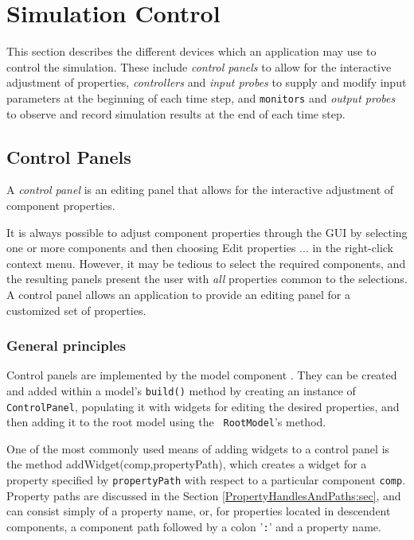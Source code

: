 
\section{Simulation Control}
\label{SimulationControl:sec}

This section describes the different devices which an application may
use to control the simulation. These include {\it control panels} to
allow for the interactive adjustment of properties, {\it controllers}
and {\it input probes} to supply and modify input parameters at the
beginning of each time step, and {\tt monitors} and {\it output
probes} to observe and record simulation results at the end of each
time step.

\subsection{Control Panels}
\label{ControlPanels:sec}

A {\it control panel} is an editing panel that allows for the
interactive adjustment of component properties.

It is always possible to adjust component properties through the GUI
by selecting one or more components and then choosing {\sf Edit
properties ...} in the right-click context menu. However, it may be
tedious to select the required components, and the resulting panels
present the user with {\it all} properties common to the selections.
A control panel allows an application to provide an editing panel for
a customized set of properties.

\subsubsection{General principles}

Control panels are implemented by the model component
. They can be created and
added within a model's {\tt build()} method by creating an instance of
{\tt ControlPanel}, populating it with widgets for editing the desired
properties, and then adding it to the root model using the {\tt
RootModel}'s
method.

One of the most commonly used means of adding widgets to a control
panel is the method
%
{addWidget(comp,propertyPath)}, which creates a widget for a property
specified by {\tt propertyPath} with respect to a particular component
{\tt comp}.  Property paths are discussed in the Section
\ref{PropertyHandlesAndPaths:sec}, and can consist simply of a
property name, or, for properties located in descendent components, a
component path followed by a colon '{\tt :}' and a property name.


